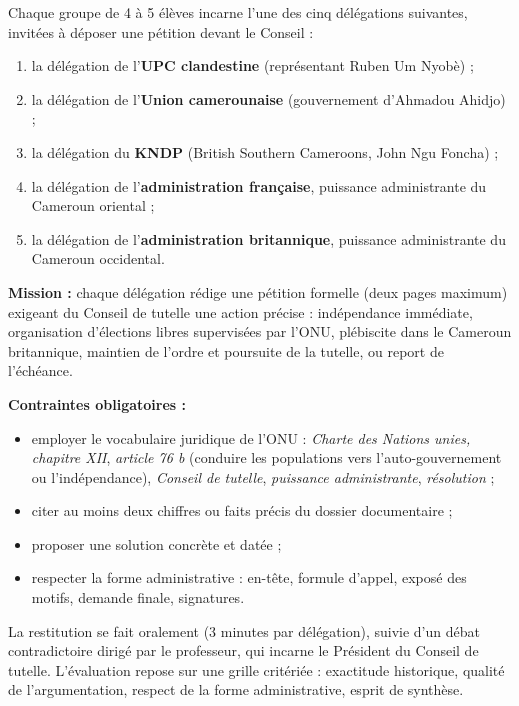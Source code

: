 \documentclass[11pt]{article}
\newcounter{popsec}
\newcounter{popsub}
\newcommand{\courssub}[1]{%
  \stepcounter{popsub}%
  \par\vspace{9pt}\noindent{\popxbold\fontsize{11.5}{13}\selectfont\color{popink}{\color{poporange}\thepopsec.\thepopsub}\hspace{6pt}#1}\par\nopagebreak\vspace{4pt}
}
\begin{document}
Chaque groupe de 4 à 5 élèves incarne l'une des cinq délégations suivantes, invitées à déposer une pétition devant le Conseil :
\begin{enumerate}
\item la délégation de l'\textbf{UPC clandestine} (représentant Ruben Um Nyobè) ;
\item la délégation de l'\textbf{Union camerounaise} (gouvernement d'Ahmadou Ahidjo) ;
\item la délégation du \textbf{KNDP} (British Southern Cameroons, John Ngu Foncha) ;
\item la délégation de l'\textbf{administration française}, puissance administrante du Cameroun oriental ;
\item la délégation de l'\textbf{administration britannique}, puissance administrante du Cameroun occidental.
\end{enumerate}

\textbf{Mission :} chaque délégation rédige une pétition formelle (deux pages maximum) exigeant du Conseil de tutelle une action précise : indépendance immédiate, organisation d'élections libres supervisées par l'ONU, plébiscite dans le Cameroun britannique, maintien de l'ordre et poursuite de la tutelle, ou report de l'échéance.

\textbf{Contraintes obligatoires :}
\begin{itemize}
\item employer le vocabulaire juridique de l'ONU : \emph{Charte des Nations unies, chapitre XII}, \emph{article 76 b} (conduire les populations vers l'auto-gouvernement ou l'indépendance), \emph{Conseil de tutelle}, \emph{puissance administrante}, \emph{résolution} ;
\item citer au moins deux chiffres ou faits précis du dossier documentaire ;
\item proposer une solution concrète et datée ;
\item respecter la forme administrative : en-tête, formule d'appel, exposé des motifs, demande finale, signatures.
\end{itemize}

La restitution se fait oralement (3 minutes par délégation), suivie d'un débat contradictoire dirigé par le professeur, qui incarne le Président du Conseil de tutelle. L'évaluation repose sur une grille critériée : exactitude historique, qualité de l'argumentation, respect de la forme administrative, esprit de synthèse.

\courssub{Consignes}
\end{document}
